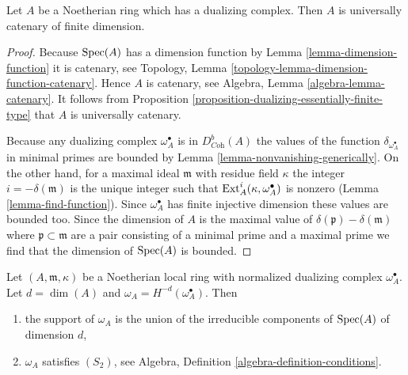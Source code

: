 \begin{lemma}
\label{lemma-universally-catenary}
Let $A$ be a Noetherian ring which has a dualizing
complex. Then $A$ is universally catenary of finite dimension.
\end{lemma}

\begin{proof}
Because $\mathop{\mathrm{Spec}}(A)$ has a dimension function by
Lemma \ref{lemma-dimension-function}
it is catenary, see
Topology, Lemma \ref{topology-lemma-dimension-function-catenary}.
Hence $A$ is catenary, see
Algebra, Lemma \ref{algebra-lemma-catenary}.
It follows from
Proposition \ref{proposition-dualizing-essentially-finite-type}
that $A$ is universally catenary.

\medskip\noindent
Because any dualizing complex $\omega_A^\bullet$ is
in $D^b_{\textit{Coh}}(A)$ the values of the function
$\delta_{\omega_A^\bullet}$ in minimal primes are bounded by
Lemma \ref{lemma-nonvanishing-generically}.
On the other hand, for a maximal ideal $\mathfrak m$ with
residue field $\kappa$ the integer $i = -\delta(\mathfrak m)$
is the unique integer such that
$\mathop{\mathrm{Ext}}\nolimits_A^i(\kappa, \omega_A^\bullet)$ is nonzero
(Lemma \ref{lemma-find-function}).
Since $\omega_A^\bullet$ has finite injective dimension
these values are bounded too. Since the dimension of
$A$ is the maximal value of $\delta(\mathfrak p) - \delta(\mathfrak m)$
where $\mathfrak p \subset \mathfrak m$ are a pair
consisting of a minimal prime and a maximal prime we find that the
dimension of $\mathop{\mathrm{Spec}}(A)$ is bounded.
\end{proof}

\begin{lemma}
\label{lemma-depth-dualizing-module}
Let $(A, \mathfrak m, \kappa)$ be a Noetherian local ring with
normalized dualizing complex $\omega_A^\bullet$. Let $d = \dim(A)$
and $\omega_A = H^{-d}(\omega_A^\bullet)$. Then
\begin{enumerate}
\item the support of $\omega_A$ is the union of the irreducible components
of $\mathop{\mathrm{Spec}}(A)$ of dimension $d$,
\item $\omega_A$ satisfies $(S_2)$, see
Algebra, Definition \ref{algebra-definition-conditions}.
\end{enumerate}
\end{lemma}

